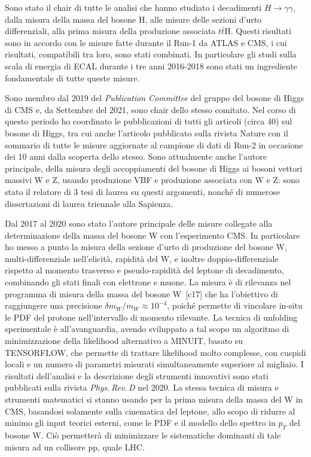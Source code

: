 \documentclass[a4paper,12pt,twoside]{article}
\begin{document}
{  Sono stato il chair di tutte le analisi che hanno studiato i
  decadimenti $H\to\gamma\gamma$, dalla misura della massa del bosone
  H, alle misure delle sezioni d'urto differenziali, alla prima misura
  della produzione associata $t\bar{t}$H. Questi risultati sono in
  accordo con le misure fatte durante il Run-1 da ATLAS e CMS, i cui
  risultati, compatibili tra loro, sono stati combinati. In particolare
  gli studi sulla scala di energia di ECAL durante i tre anni 2016-2018 sono
  stati un ingrediente fondamentale di tutte queste misure. 

  Sono membro dal 2019 del {\it Publication Committee} del gruppo del
  bosone di Higgs di CMS e, da Settembre del 2021, sono chair dello
  stesso comitato. Nel corso di questo periodo ho coordinato le
  pubblicazioni di tutti gli articoli (circa 40) sul bosone di Higgs,
  tra cui anche l'articolo pubblicato sulla rivista Nature con il
  sommario di tutte le misure aggiornate al campione di dati di Run-2
  in occasione dei 10 anni dalla scoperta dello stesso. Sono
  attualmente anche l'autore principale, della misura degli
  accoppiamenti del bosone di Higgs ai bosoni vettori massivi W e Z,
  usando produzione VBF e produzione associata con W e Z: sono stato
  il relatore di 3 tesi di laurea su questi argomenti, nonch\'e di
  numerose dissertazioni di laurea triennale alla Sapienza.

  Dal 2017 al 2020 sono stato l'autore principale delle misure
  collegate alla determinazione della massa del bosone W con
  l'esperimento CMS. In particolare ho messo a punto la misura della
  sezione d'urto di produzione del bosone W, multi-differenziale
  nell'elicit\`a, rapidit\`a del W, e inoltre doppio-differenziale
  rispetto al momento trasverso e pseudo-rapidit\`a del leptone di
  decadimento, combinando gli stati finali con elettrone e muone. La
  misura \`e di rilevanza nel programma di misura della massa del
  bosone W~[c17] che ha l'obiettivo di raggiungere una precisione
  $\delta m_W/m_W\approx 10^{-4}$, poich\'e permette di vincolare
  in-situ le PDF del protone nell'intervallo di momento rilevante. La
  tecnica di unfolding sperimentale \`e all'avanguardia, avendo
  sviluppato a tal scopo un algoritmo di minimizzazione della
  likelihood alternativo a \textsc{MINUIT}, basato su
  \textsc{TENSORFLOW}, che permette di trattare likelihood molto
  complesse, con cuspidi locali e un numero di parametri misurati
  simultaneamente superiore al migliaio. I risultati dell'analisi e la
  descrizione degli strumenti innovativi sono stati pubblicati sulla
  rivista \textit{Phys.\,Rev.\,D} nel 2020. La stessa tecnica di
  misura e strumenti matematici si stanno usando per la prima misura
  della massa del W in CMS, basandosi solamente sulla cinematica del
  leptone, allo scopo di ridurre al minimo gli input teorici esterni,
  come le PDF e il modello dello spettro in $p_T$ del bosone W.  Ci\`o
  permetter\`a di minimizzare le sistematiche dominanti di tale misura
  ad un collisore pp, quale LHC.


}
\end{document}
